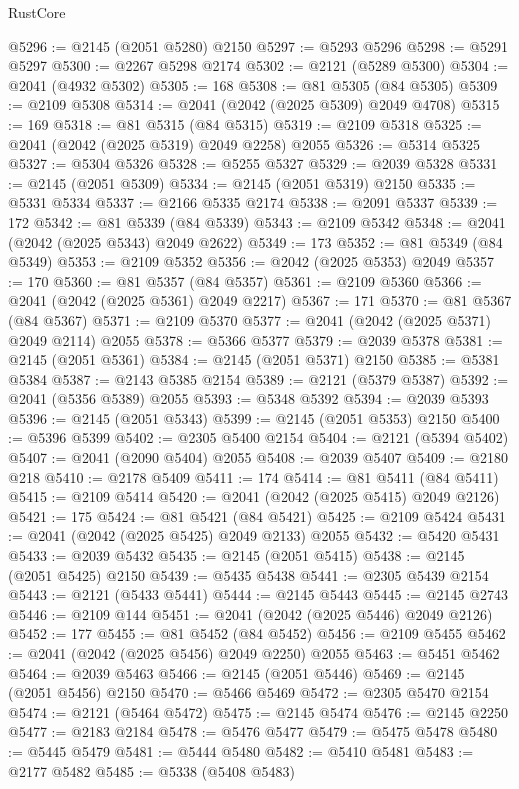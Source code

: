 \begin{lexlean}{RustCore}
\begin{coremodule}
@5296 := @2145 (@2051 @5280) @2150
@5297 := @5293 @5296
@5298 := @5291 @5297
@5300 := @2267 @5298 @2174
@5302 := @2121 (@5289 @5300)
@5304 := @2041 (@4932 @5302)
@5305 := 168
@5308 := @81 @5305 (@84 @5305)
@5309 := @2109 @5308
@5314 := @2041 (@2042 (@2025 @5309) @2049 @4708)
@5315 := 169
@5318 := @81 @5315 (@84 @5315)
@5319 := @2109 @5318
@5325 := @2041 (@2042 (@2025 @5319) @2049 @2258) @2055
@5326 := @5314 @5325
@5327 := @5304 @5326
@5328 := @5255 @5327
@5329 := @2039 @5328
@5331 := @2145 (@2051 @5309)
@5334 := @2145 (@2051 @5319) @2150
@5335 := @5331 @5334
@5337 := @2166 @5335 @2174
@5338 := @2091 @5337
@5339 := 172
@5342 := @81 @5339 (@84 @5339)
@5343 := @2109 @5342
@5348 := @2041 (@2042 (@2025 @5343) @2049 @2622)
@5349 := 173
@5352 := @81 @5349 (@84 @5349)
@5353 := @2109 @5352
@5356 := @2042 (@2025 @5353) @2049
@5357 := 170
@5360 := @81 @5357 (@84 @5357)
@5361 := @2109 @5360
@5366 := @2041 (@2042 (@2025 @5361) @2049 @2217)
@5367 := 171
@5370 := @81 @5367 (@84 @5367)
@5371 := @2109 @5370
@5377 := @2041 (@2042 (@2025 @5371) @2049 @2114) @2055
@5378 := @5366 @5377
@5379 := @2039 @5378
@5381 := @2145 (@2051 @5361)
@5384 := @2145 (@2051 @5371) @2150
@5385 := @5381 @5384
@5387 := @2143 @5385 @2154
@5389 := @2121 (@5379 @5387)
@5392 := @2041 (@5356 @5389) @2055
@5393 := @5348 @5392
@5394 := @2039 @5393
@5396 := @2145 (@2051 @5343)
@5399 := @2145 (@2051 @5353) @2150
@5400 := @5396 @5399
@5402 := @2305 @5400 @2154
@5404 := @2121 (@5394 @5402)
@5407 := @2041 (@2090 @5404) @2055
@5408 := @2039 @5407
@5409 := @2180 @218
@5410 := @2178 @5409
@5411 := 174
@5414 := @81 @5411 (@84 @5411)
@5415 := @2109 @5414
@5420 := @2041 (@2042 (@2025 @5415) @2049 @2126)
@5421 := 175
@5424 := @81 @5421 (@84 @5421)
@5425 := @2109 @5424
@5431 := @2041 (@2042 (@2025 @5425) @2049 @2133) @2055
@5432 := @5420 @5431
@5433 := @2039 @5432
@5435 := @2145 (@2051 @5415)
@5438 := @2145 (@2051 @5425) @2150
@5439 := @5435 @5438
@5441 := @2305 @5439 @2154
@5443 := @2121 (@5433 @5441)
@5444 := @2145 @5443
@5445 := @2145 @2743
@5446 := @2109 @144
@5451 := @2041 (@2042 (@2025 @5446) @2049 @2126)
@5452 := 177
@5455 := @81 @5452 (@84 @5452)
@5456 := @2109 @5455
@5462 := @2041 (@2042 (@2025 @5456) @2049 @2250) @2055
@5463 := @5451 @5462
@5464 := @2039 @5463
@5466 := @2145 (@2051 @5446)
@5469 := @2145 (@2051 @5456) @2150
@5470 := @5466 @5469
@5472 := @2305 @5470 @2154
@5474 := @2121 (@5464 @5472)
@5475 := @2145 @5474
@5476 := @2145 @2250
@5477 := @2183 @2184
@5478 := @5476 @5477
@5479 := @5475 @5478
@5480 := @5445 @5479
@5481 := @5444 @5480
@5482 := @5410 @5481
@5483 := @2177 @5482
@5485 := @5338 (@5408 @5483)

\end{coremodule}
\end{lexlean}
